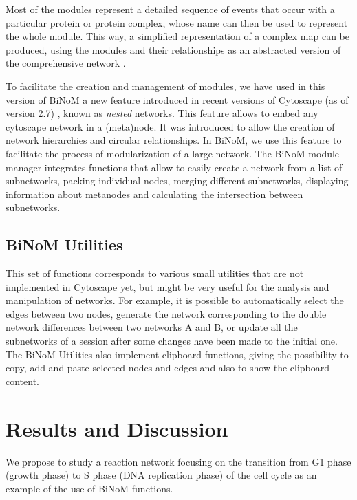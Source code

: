 \documentclass[10pt]{bmc_article}
\newenvironment{bmcformat}{\baselineskip20pt\sloppy\setboolean{publ}{false}}{\baselineskip20pt\sloppy}
\begin{document}
\begin{bmcformat}
Most of the modules represent a detailed
sequence of events that occur with a particular protein or protein complex,
whose name can then be used to represent the whole module. This way, a
simplified representation of a complex map can be produced, using the modules
and their relationships as an abstracted version of the comprehensive network
\cite{calzone2008comprehensive}.

To facilitate the creation and management of modules, we have used in this
version of BiNoM a new feature introduced in recent versions of Cytoscape (as of
version 2.7) \cite{cline2007integration}, known as \emph{nested} networks. This
feature allows to embed any cytoscape network in a (meta)node. It was
introduced to allow the creation of network hierarchies and circular
relationships. In BiNoM, we use this feature to facilitate the process of
modularization of a large network. The BiNoM module manager integrates
functions that allow to easily create a network from a list of subnetworks,
packing individual nodes, merging different subnetworks, displaying information
about metanodes and calculating the intersection between subnetworks.

\subsection*{BiNoM Utilities}
This set of functions corresponds to various small utilities that are not
implemented in Cytoscape yet, but might be very useful for the analysis and
manipulation of networks. For example, it is possible to automatically select
the edges between two nodes, generate the network corresponding to the double
network differences between two networks A and B, or update all the subnetworks of
a session after some changes have been made to the initial one. The BiNoM Utilities also implement
clipboard functions, giving the possibility to copy, add and paste
selected nodes and edges and also to show the clipboard content.


\section*{Results and Discussion}
We propose to study a reaction network focusing on the transition from G1 phase
(growth phase) to S phase (DNA replication phase) of the cell cycle
\cite{calzone2008comprehensive} as an example of the use of BiNoM functions.


\end{bmcformat}
\end{document}
